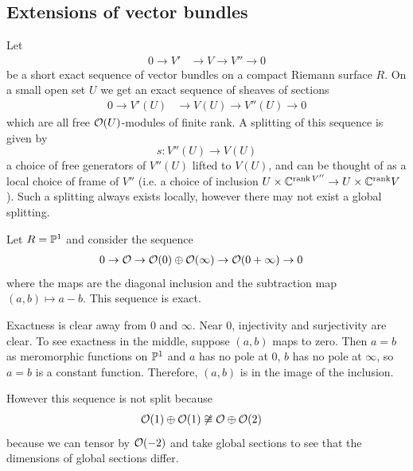 \documentclass[12pt]{article}
\begin{document}
\subsection{Extensions of vector bundles}

Let \begin{align*}
    0 \to V' & \to V \to V'' \to 0
\end{align*} be a short exact sequence of vector bundles on a compact Riemann surface $R$. On a small open set $U$ we get an exact sequence of sheaves of sections \begin{align*}
    0 \to V'(U) & \to V(U) \to V''(U) \to 0
\end{align*} which are all free $\cO(U)$-modules of finite rank. A splitting of this sequence is given by \[s: V''(U) \to V(U)\] a choice of free generators of $V''(U)$ lifted to $V(U)$, and can be thought of as a local choice of frame of $V''$ (i.e. a choice of inclusion $U\times \C^{\operatorname{rank} V''} \to U\times \C^{\operatorname{rank} }V$). Such a splitting always exists locally, however there may not exist a global splitting.

\begin{example}
    Let $R = \P^1$ and consider the sequence \begin{align*}
        0 \to \cO \to \cO(0) \oplus \cO(\infty) & \to \cO(0 + \infty) \to 0
    \end{align*} where the maps are the diagonal inclusion and the subtraction map $(a,b) \mapsto a-b$. This sequence is exact.

    Exactness is clear away from $0$ and $\infty$. Near $0$, injectivity and surjectivity are clear. To see exactness in the middle, suppose $(a,b)$ maps to zero. Then $a=b$ as meromorphic functions on $\P^1$ and $a$ has no pole at $0$, $b$ has no pole at $\infty$, so $a=b$ is a constant function. Therefore, $(a,b)$ is in the image of the inclusion.

    However this sequence is not split because \begin{align*}
        \cO (1) \oplus \cO(1) & \not\cong \cO \oplus \cO(2)
    \end{align*} because we can tensor by $\cO(-2)$ and take global sections to see that the dimensions of global sections differ.
\end{example}
\end{document}

